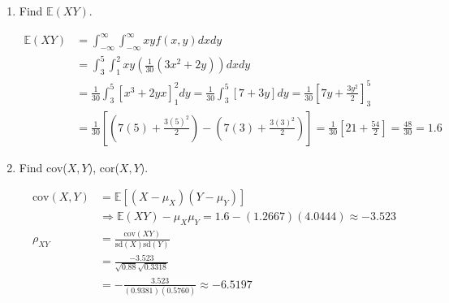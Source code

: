 \begin{enumerate}[label=(\alph*)]
        \item Find $\mathbb{E}(XY)$.
        \\
        \begin{mdframed}
            \begin{align*}
                \mathbb{E}(XY)  & = \int_{-\infty}^{\infty}\int_{-\infty}^{\infty}
                                    xyf(x,y)dxdy                                            \\
                                & = \int_{3}^{5}\int_{1}^{2}
                                    xy\left(\frac{1}{30}(3x^{2}+2y)\right)dxdy              \\
                                & = \frac{1}{30}\int_{3}^{5}
                                    \left[x^{3}+2yx\right]_{1}^{2}dy =
                                    \frac{1}{30}\int_{3}^{5}[7 + 3y]dy                            
                                    = \frac{1}{30}\left[7y + \frac{3y^{2}}{2}\right]_{3}^{5}\\
                                &  = \frac{1}{30}
                                  \left[
                                    \left(7(5) + \frac{3(5)^{2}}{2}\right) -
                                    \left(7(3) + \frac{3(3)^{2}}{2}\right)
                                  \right]                                                   
                                  = \frac{1}{30}\left[21 + \frac{54}{2}\right]
                                  = \boxed{\frac{48}{30} = 1.6}
            \end{align*}
        \end{mdframed}

        \item Find cov($X,Y$), cor($X,Y$).
        \\
        \begin{mdframed}
            \begin{align*}
                \text{cov}(X,Y) & = \mathbb{E}[(X-\mu_{X})(Y-\mu_{Y})]                      \\
                                & \Rightarrow \mathbb{E}(XY)-\mu_{X}\mu_{Y}                 
                                  = 1.6 - (1.2667)(4.0444) \approx \boxed{-3.523}           \\
                \rho_{XY}       & = \frac{\text{cov}(XY)}{\text{sd}(X)\text{sd}(Y)}         \\
                                & = \frac{-3.523}{\sqrt{0.88}\sqrt{0.3318}}                 \\
                                & = -\frac{3.523}{(0.9381)(0.5760)} \approx \boxed{-6.5197}
            \end{align*}
        \end{mdframed}
    \end{enumerate}


